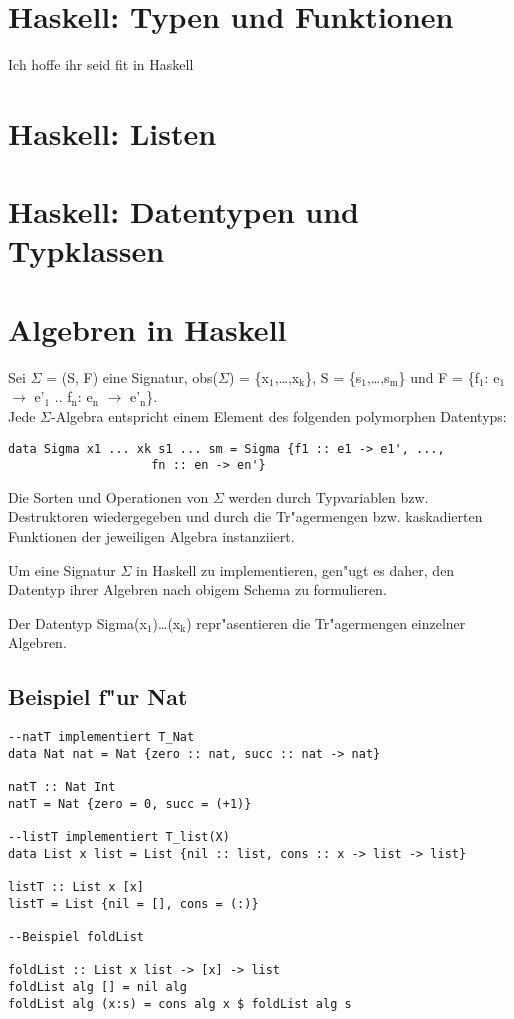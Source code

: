 \documentclass[11pt]{article}
\begin{document}
\section{Haskell: Typen und Funktionen}
\label{sec-8}
Ich hoffe ihr seid fit in Haskell

\section{Haskell: Listen}
\label{sec-9}

\section{Haskell: Datentypen und Typklassen}
\label{sec-10}

\section{Algebren in Haskell}
\label{sec-11}

Sei $\Sigma$ = (S, F) eine Signatur, obs($\Sigma$) = \{x$_{\text{1}}$,\ldots{},x$_{\text{k}}$\}, S = \{s$_{\text{1}}$,\ldots{},s$_{\text{m}}$\} und F = \{f$_{\text{1}}$: e$_{\text{1}}$ $\to$ e'$_{\text{1}}$ .. f$_{\text{n}}$: e$_{\text{n}}$ $\to$ e'$_{\text{n}}$\}.\\
Jede $\Sigma$-Algebra entspricht einem Element des folgenden polymorphen Datentyps:
\begin{verbatim}
data Sigma x1 ... xk s1 ... sm = Sigma {f1 :: e1 -> e1', ...,
					fn :: en -> en'}
\end{verbatim}

Die Sorten und Operationen von $\Sigma$ werden durch Typvariablen bzw. Destruktoren wiedergegeben und durch die Tr"agermengen bzw. 
kaskadierten Funktionen der jeweiligen Algebra instanziiert.

Um eine Signatur $\Sigma$ in Haskell zu implementieren, gen"ugt es daher, den Datentyp ihrer Algebren nach obigem Schema zu formulieren.

Der Datentyp Sigma(x$_{\text{1}}$)\ldots{}(x$_{\text{k}}$) repr"asentieren die Tr"agermengen einzelner Algebren.

\subsection{Beispiel f"ur Nat}
\label{sec-11-1}

\begin{verbatim}
--natT implementiert T_Nat
data Nat nat = Nat {zero :: nat, succ :: nat -> nat}

natT :: Nat Int
natT = Nat {zero = 0, succ = (+1)}

--listT implementiert T_list(X)
data List x list = List {nil :: list, cons :: x -> list -> list}

listT :: List x [x]
listT = List {nil = [], cons = (:)}

--Beispiel foldList

foldList :: List x list -> [x] -> list
foldList alg [] = nil alg
foldList alg (x:s) = cons alg x $ foldList alg s
\end{verbatim}
\end{document}

